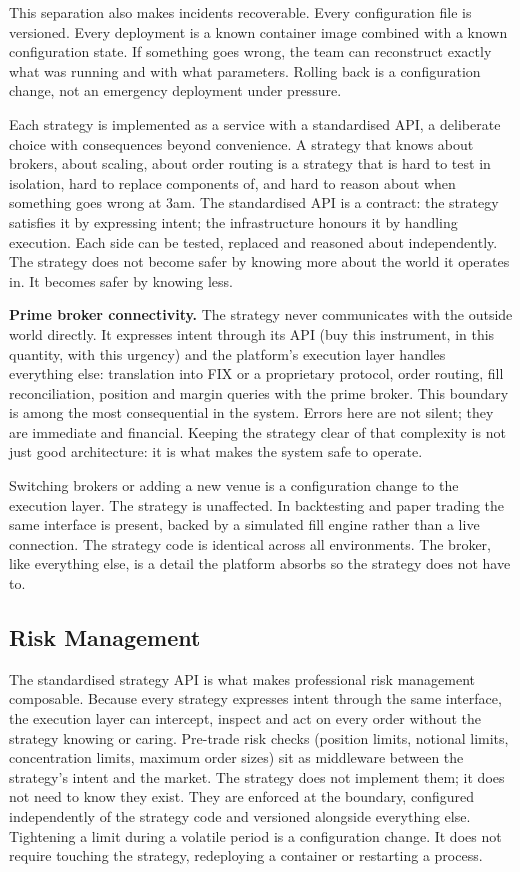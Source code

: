 \documentclass[
  11pt,
]{article}
\begin{document}
This separation also makes incidents recoverable. Every configuration
file is versioned. Every deployment is a known container image combined
with a known configuration state. If something goes wrong, the team can
reconstruct exactly what was running and with what parameters. Rolling
back is a configuration change, not an emergency deployment under
pressure.

Each strategy is implemented as a service with a standardised API, a
deliberate choice with consequences beyond convenience. A strategy that
knows about brokers, about scaling, about order routing is a strategy
that is hard to test in isolation, hard to replace components of, and
hard to reason about when something goes wrong at 3am. The standardised
API is a contract: the strategy satisfies it by expressing intent; the
infrastructure honours it by handling execution. Each side can be
tested, replaced and reasoned about independently. The strategy does not
become safer by knowing more about the world it operates in. It becomes
safer by knowing less.

\textbf{Prime broker connectivity.} The strategy never communicates with
the outside world directly. It expresses intent through its API (buy
this instrument, in this quantity, with this urgency) and the
platform's execution layer handles
everything else: translation into FIX or a proprietary protocol, order
routing, fill reconciliation, position and margin queries with the prime
broker. This boundary is among the most consequential in the system.
Errors here are not silent; they are immediate and financial. Keeping
the strategy clear of that complexity is not just good architecture:
it is what makes the system safe to operate.

Switching brokers or adding a new venue is a configuration change to the
execution layer. The strategy is unaffected. In backtesting and paper
trading the same interface is present, backed by a simulated fill engine
rather than a live connection. The strategy code is identical across all
environments. The broker, like everything else, is a detail the platform
absorbs so the strategy does not have to.

\subsection{Risk Management}\label{risk-management}

The standardised strategy API is what makes professional risk management
composable. Because every strategy expresses intent through the same
interface, the execution layer can intercept, inspect and act on every
order without the strategy knowing or caring. Pre-trade risk checks (position limits, notional limits, concentration limits, maximum order
sizes) sit as middleware between the strategy's intent and the
market. The strategy does not implement them; it does not need to know
they exist. They are enforced at the boundary, configured independently
of the strategy code and versioned alongside everything else. Tightening
a limit during a volatile period is a configuration change. It does not
require touching the strategy, redeploying a container or restarting a
process.
\end{document}
